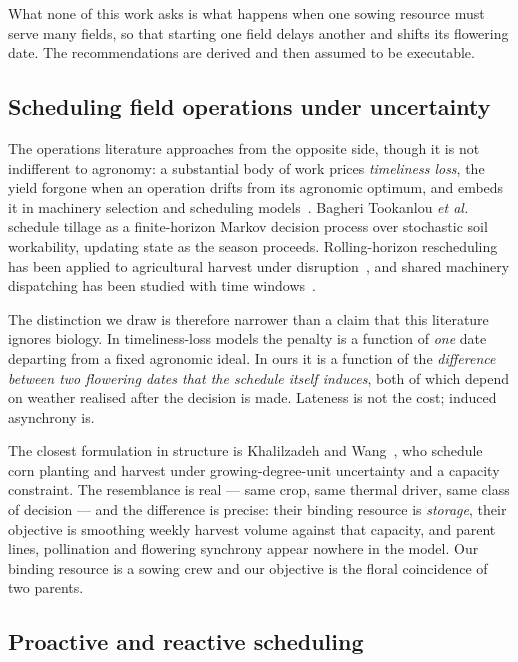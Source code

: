 \documentclass[10pt,twocolumn]{article}
\begin{document}
What none of this work asks is what happens when one sowing resource must
serve many fields, so that starting one field delays another and shifts its
flowering date. The recommendations are derived and then assumed to be
executable.

\subsection{Scheduling field operations under uncertainty}

The operations literature approaches from the opposite side, though it is not
indifferent to agronomy: a substantial body of work prices \emph{timeliness
loss}, the yield forgone when an operation drifts from its agronomic optimum,
and embeds it in machinery selection and scheduling
models~\cite{sun2023}. Bagheri Tookanlou \textit{et al.}~\cite{bagheri2025}
schedule tillage as a finite-horizon Markov decision process over stochastic
soil workability, updating state as the season proceeds. Rolling-horizon
rescheduling has been applied to agricultural harvest under
disruption~\cite{rollinghorizon2023}, and shared machinery dispatching has
been studied with time windows~\cite{shared2022}.

The distinction we draw is therefore narrower than a claim that this
literature ignores biology. In timeliness-loss models the penalty is a
function of \emph{one} date departing from a fixed agronomic ideal. In ours
it is a function of the \emph{difference between two flowering dates that the
schedule itself induces}, both of which depend on weather realised after the
decision is made. Lateness is not the cost; induced asynchrony is.

The closest formulation in structure is Khalilzadeh and
Wang~\cite{khalilzadeh2022}, who schedule corn planting and harvest under
growing-degree-unit uncertainty and a capacity constraint. The resemblance is
real --- same crop, same thermal driver, same class of decision --- and the
difference is precise: their binding resource is \emph{storage}, their
objective is smoothing weekly harvest volume against that capacity, and
parent lines, pollination and flowering synchrony appear nowhere in the
model. Our binding resource is a sowing crew and our objective is the floral
coincidence of two parents.

\subsection{Proactive and reactive scheduling}
\end{document}
